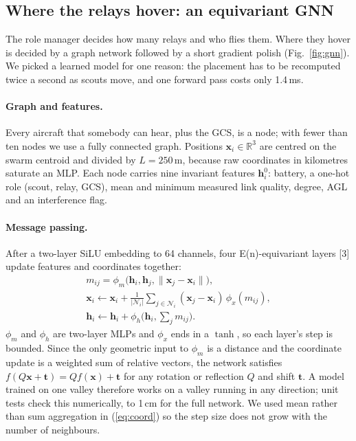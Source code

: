 \documentclass[10pt,a4paper,twocolumn]{article}
\begin{document}
\subsection{Where the relays hover: an equivariant GNN}\label{sec:gnn}
The role manager decides how many relays and who flies them. Where they hover is decided by a graph network followed by a short gradient polish (Fig.~\ref{fig:gnn}). We picked a learned model for one reason: the placement has to be recomputed twice a second as scouts move, and one forward pass costs only 1.4\,ms.

\paragraph{Graph and features.} Every aircraft that somebody can hear, plus the GCS, is a node; with fewer than ten nodes we use a fully connected graph. Positions $\mathbf x_i\in\mathbb R^3$ are centred on the swarm centroid and divided by $L=250$\,m, because raw coordinates in kilometres saturate an MLP. Each node carries nine invariant features $\mathbf h^0_i$: battery, a one-hot role (scout, relay, GCS), mean and minimum measured link quality, degree, AGL and an interference flag.

\paragraph{Message passing.} After a two-layer SiLU embedding to 64 channels, four E(n)-equivariant layers [3] update features and coordinates together:
\begin{gather}
m_{ij}=\phi_m\big(\mathbf h_i,\mathbf h_j,\|\mathbf x_j-\mathbf x_i\|\big),\label{eq:msg}\\
\mathbf x_i\leftarrow\mathbf x_i+\frac{1}{|\mathcal N_i|}\sum_{j\in\mathcal N_i}(\mathbf x_j-\mathbf x_i)\,\phi_x(m_{ij}),\label{eq:coord}\\
\mathbf h_i\leftarrow\mathbf h_i+\phi_h\Big(\mathbf h_i,\sum_{j}m_{ij}\Big).\label{eq:feat}
\end{gather}
$\phi_m$ and $\phi_h$ are two-layer MLPs and $\phi_x$ ends in a $\tanh$, so each layer's step is bounded. Since the only geometric input to $\phi_m$ is a distance and the coordinate update is a weighted sum of relative vectors, the network satisfies $f(Q\mathbf x+\mathbf t)=Qf(\mathbf x)+\mathbf t$ for any rotation or reflection $Q$ and shift $\mathbf t$. A model trained on one valley therefore works on a valley running in any direction; unit tests check this numerically, to 1\,cm for the full network. We used mean rather than sum aggregation in (\ref{eq:coord}) so the step size does not grow with the number of neighbours.
\end{document}
